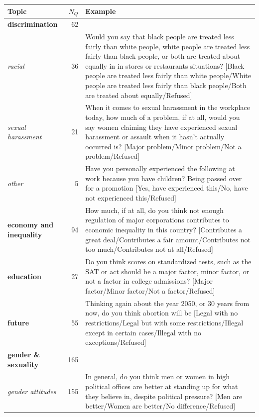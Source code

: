 \begin{table}[!h]
    \renewcommand{\arraystretch}{1.5}
    \begin{center}
    \begin{small}
        \begin{tabular}{p{4.5cm}rp{10.5cm}}
            \toprule
            Topic &  $N_Q$ & Example \\
            \midrule
            \textbf{discrimination} &    62 &  \\ 
            \emph{racial} &    36 & Would you say that black people are treated less fairly than white people, white people are treated less fairly than black people, or both are treated about equally in in stores or restaurants situations? [Black people are treated less fairly than white people/White people are treated less fairly than black people/Both are treated about equally/Refused] \\ 
            \emph{sexual harassment} &    21 & When it comes to sexual harassment in the workplace today, how much of a problem, if at all, would you say women claiming they have experienced sexual harassment or assault when it hasn't actually occurred is? [Major problem/Minor problem/Not a problem/Refused]  \\ 
            \emph{other} &    5 & Have you personally experienced the following at work because you have children? Being passed over for a promotion [Yes, have experienced this/No, have not experienced this/Refused] \\  \hline
            \textbf{economy and inequality} &    94 & How much, if at all, do you think not enough regulation of major corporations contributes to economic inequality in this country? [Contributes a great deal/Contributes a fair amount/Contributes not too much/Contributes not at all/Refused] \\ \hline
            \textbf{education} &    27 & Do you think scores on standardized tests, such as the SAT or act should be a major factor, minor factor, or not a factor in college admissions? [Major factor/Minor factor/Not a factor/Refused] \\ \hline
            \textbf{future} &    55 & Thinking again about the year 2050, or 30 years from now, do you think abortion will be [Legal with no restrictions/Legal but with some restrictions/Illegal except in certain cases/Illegal with no exceptions/Refused] \\ \hline
            \textbf{gender \& sexuality} &   165 &  \\
            \textit{gender attitudes} &   155 &  In general, do you think men or women in high political offices are better at standing up for what they believe in, despite political pressure? [Men are better/Women are better/No difference/Refused] \\

\end{tabular}
\end{small}
\end{center}
\end{table}
